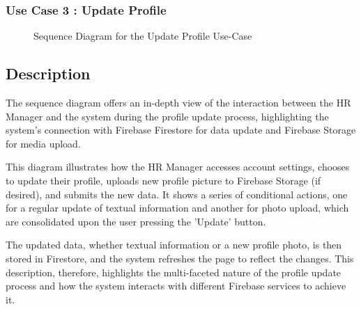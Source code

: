 \subsubsection{Use Case 3 : Update Profile} 
\begin{figure}[H]
    \centering
    \caption{ Sequence Diagram for the Update Profile Use-Case }
    \label{fig:UseCase3_Sequence_Diagram}
\end{figure}

\subsection*{Description}
The sequence diagram offers an in-depth view of the interaction between the HR Manager and the system during the profile update process, highlighting the system's connection with Firebase Firestore for data update and Firebase Storage for media upload.

This diagram illustrates how the HR Manager accesses account settings, chooses to update their profile, uploads new profile picture to Firebase Storage (if desired), and submits the new data. It shows a series of conditional actions, one for a regular update of textual information and another for photo upload, which are consolidated upon the user pressing the 'Update' button.

The updated data, whether textual information or a new profile photo, is then stored in Firestore, and the system refreshes the page to reflect the changes. This description, therefore, highlights the multi-faceted nature of the profile update process and how the system interacts with different Firebase services to achieve it.


